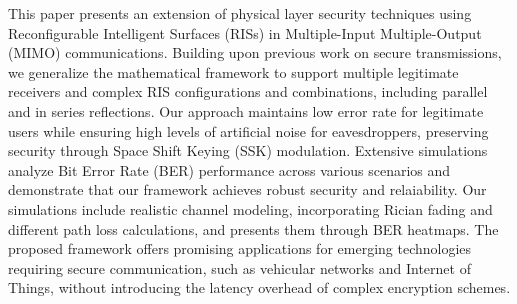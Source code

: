 This paper presents an extension of physical layer security techniques using Reconfigurable Intelligent Surfaces (RISs) in Multiple-Input Multiple-Output (MIMO) communications. Building upon previous work on secure transmissions, we generalize the mathematical framework to support multiple legitimate receivers and complex RIS configurations and combinations, including parallel and in series reflections. Our approach maintains low error rate for legitimate users while ensuring high levels of artificial noise for eavesdroppers, preserving security through Space Shift Keying (SSK) modulation. Extensive simulations analyze Bit Error Rate (BER) performance across various scenarios and demonstrate that our framework achieves robust security and relaiability. Our simulations include realistic channel modeling, incorporating Rician fading and different path loss calculations, and presents them through BER heatmaps. The proposed framework offers promising applications for emerging technologies requiring secure communication, such as vehicular networks and Internet of Things, without introducing the latency overhead of complex encryption schemes.
